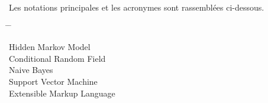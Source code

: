 Les notations principales et les acronymes sont rassemblées ci-dessous.\\

\begin{tabbing}
\hspace{3cm} \= \hspace{3cm} \= \kill

 \> Hidden Markov Model\\
 \> Conditional Random Field\\
	\> Naive Bayes\\
 \> Support Vector Machine\\
 \> Extensible Markup Language\\
\end{tabbing}



